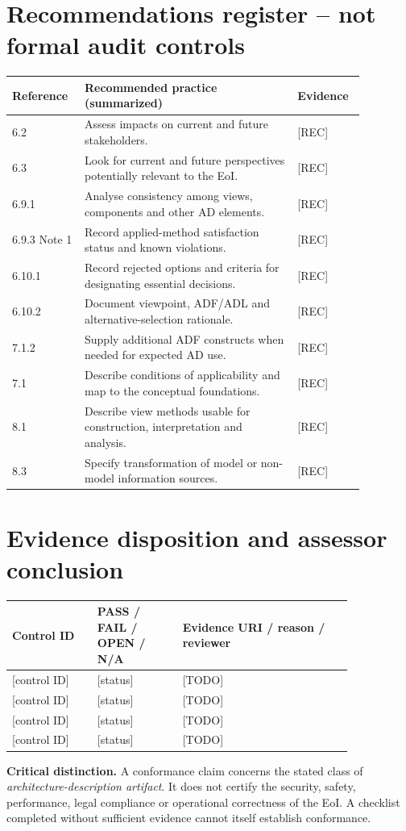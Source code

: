 \documentclass[11pt,letterpaper]{article}
\begin{document}
\section{Recommendations register -- not formal audit controls}
\begin{longtable}{p{0.16\linewidth}p{0.55\linewidth}p{0.16\linewidth}}\toprule\textbf{Reference}&\textbf{Recommended practice (summarized)}&\textbf{Evidence}\\\midrule\endhead
6.2&Assess impacts on current and future stakeholders.&[REC]\\
6.3&Look for current and future perspectives potentially relevant to the EoI.&[REC]\\
6.9.1&Analyse consistency among views, components and other AD elements.&[REC]\\
6.9.3 Note 1&Record applied-method satisfaction status and known violations.&[REC]\\
6.10.1&Record rejected options and criteria for designating essential decisions.&[REC]\\
6.10.2&Document viewpoint, ADF/ADL and alternative-selection rationale.&[REC]\\
7.1.2&Supply additional ADF constructs when needed for expected AD use.&[REC]\\
7.1&Describe conditions of applicability and map to the conceptual foundations.&[REC]\\
8.1&Describe view methods usable for construction, interpretation and analysis.&[REC]\\
8.3&Specify transformation of model or non-model information sources.&[REC]\\\bottomrule\end{longtable}
\section{Evidence disposition and assessor conclusion}
\begin{longtable}{p{0.21\linewidth}p{0.21\linewidth}p{0.42\linewidth}}\toprule\textbf{Control ID}&\textbf{PASS / FAIL / OPEN / N/A}&\textbf{Evidence URI / reason / reviewer}\\\midrule\endhead
{[control ID]}&[status]&[TODO]\\
{[control ID]}&[status]&[TODO]\\
{[control ID]}&[status]&[TODO]\\
{[control ID]}&[status]&[TODO]\\\bottomrule\end{longtable}
\begin{Requirement}\textbf{Critical distinction.} A conformance claim concerns the stated class of \emph{architecture-description artifact}. It does not certify the security, safety, performance, legal compliance or operational correctness of the EoI. A checklist completed without sufficient evidence cannot itself establish conformance. \end{Requirement}
\LegalFooter
\end{document}
